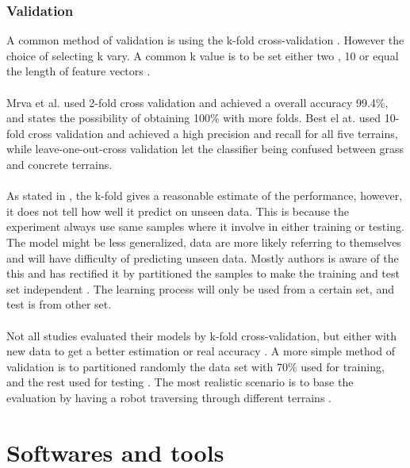 \documentclass[USenglish]{ifimaster}  %
\begin{document}
	\subsection{Validation}\label{subseq:validation}
	A common method of validation is using the k-fold cross-validation \cite{DBLP:conf/itat/MrvaF15,6784609,6386243,Hoffmann20141790,6849778,7387710}. However the choice of selecting k vary. A common k value is to be set either two \cite{DBLP:conf/itat/MrvaF15,6784609}, 10 \cite{26b23e912c654fe4b7478fd910130195,6386243,Hoffmann20141790,6849778,7387710} or equal the length of feature vectors \cite{26b23e912c654fe4b7478fd910130195}.
	\\
	\\
	Mrva et al. \cite{DBLP:conf/itat/MrvaF15} used 2-fold cross validation and achieved a overall accuracy 99.4\%, and states the possibility of obtaining 100\% with more folds. Best el at. \cite{26b23e912c654fe4b7478fd910130195} used 10-fold cross validation and achieved a high precision and recall for all five terrains, while leave-one-out-cross validation let the classifier being confused between grass and concrete terrains. 
	\\
	\\
	As stated in \cite{7387710}, the k-fold gives a reasonable estimate of the performance, however, it does not tell how well it predict on unseen data. This is because the experiment always use same samples where it involve in either training or testing. The model might be less generalized, data are more likely referring to themselves and will have difficulty of predicting unseen data. Mostly authors is aware of the this and has rectified it by partitioned the samples to make the training and test set independent \cite{26b23e912c654fe4b7478fd910130195}. The learning process will only be used from a certain set, and test is from other set.
	\\
	\\
	Not all studies evaluated their models by k-fold cross-validation, but either with new data to get a better estimation or real accuracy \cite{5509309,Walas2015,5752869}. A more simple method of validation is to partitioned randomly the data set with 70\% used for training, and the rest used for testing \cite{5752869}. The most realistic scenario is to base the evaluation by having a robot traversing through different terrains \cite{DBLP:conf/itat/MrvaF15}.
	
\chapter{Softwares and tools}
	
\end{document}
